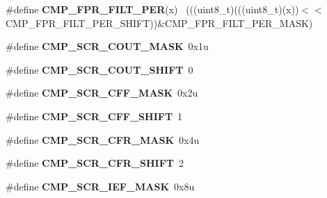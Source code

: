 \begin{DoxyCompactItemize}
\item 
\hypertarget{group___c_m_p___register___masks_ga64552c5393c5361b4e87fae0df10308e}{}\#define {\bfseries C\+M\+P\+\_\+\+F\+P\+R\+\_\+\+F\+I\+L\+T\+\_\+\+P\+E\+R}(x)                                        ~(((uint8\+\_\+t)(((uint8\+\_\+t)(x))$<$$<$C\+M\+P\+\_\+\+F\+P\+R\+\_\+\+F\+I\+L\+T\+\_\+\+P\+E\+R\+\_\+\+S\+H\+I\+F\+T))\&C\+M\+P\+\_\+\+F\+P\+R\+\_\+\+F\+I\+L\+T\+\_\+\+P\+E\+R\+\_\+\+M\+A\+S\+K)\label{group___c_m_p___register___masks_ga64552c5393c5361b4e87fae0df10308e}

\item 
\hypertarget{group___c_m_p___register___masks_ga024aec72a28ecdc04a1441cd7a3af23a}{}\#define {\bfseries C\+M\+P\+\_\+\+S\+C\+R\+\_\+\+C\+O\+U\+T\+\_\+\+M\+A\+S\+K}~0x1u\label{group___c_m_p___register___masks_ga024aec72a28ecdc04a1441cd7a3af23a}

\item 
\hypertarget{group___c_m_p___register___masks_gaa508076192a6b9aed5c4d46282c64394}{}\#define {\bfseries C\+M\+P\+\_\+\+S\+C\+R\+\_\+\+C\+O\+U\+T\+\_\+\+S\+H\+I\+F\+T}~0\label{group___c_m_p___register___masks_gaa508076192a6b9aed5c4d46282c64394}

\item 
\hypertarget{group___c_m_p___register___masks_gaab44e3da0576b12dd809881323944a1c}{}\#define {\bfseries C\+M\+P\+\_\+\+S\+C\+R\+\_\+\+C\+F\+F\+\_\+\+M\+A\+S\+K}~0x2u\label{group___c_m_p___register___masks_gaab44e3da0576b12dd809881323944a1c}

\item 
\hypertarget{group___c_m_p___register___masks_ga076d455f0d5bdad02282cbcce6e04c01}{}\#define {\bfseries C\+M\+P\+\_\+\+S\+C\+R\+\_\+\+C\+F\+F\+\_\+\+S\+H\+I\+F\+T}~1\label{group___c_m_p___register___masks_ga076d455f0d5bdad02282cbcce6e04c01}

\item 
\hypertarget{group___c_m_p___register___masks_ga876bfa2799338c6b10b152940d25c4a7}{}\#define {\bfseries C\+M\+P\+\_\+\+S\+C\+R\+\_\+\+C\+F\+R\+\_\+\+M\+A\+S\+K}~0x4u\label{group___c_m_p___register___masks_ga876bfa2799338c6b10b152940d25c4a7}

\item 
\hypertarget{group___c_m_p___register___masks_ga78595d16db987c96e73ce96fc5436f6b}{}\#define {\bfseries C\+M\+P\+\_\+\+S\+C\+R\+\_\+\+C\+F\+R\+\_\+\+S\+H\+I\+F\+T}~2\label{group___c_m_p___register___masks_ga78595d16db987c96e73ce96fc5436f6b}

\item 
\hypertarget{group___c_m_p___register___masks_gab36859944bb484db243358bb9a1a9692}{}\#define {\bfseries C\+M\+P\+\_\+\+S\+C\+R\+\_\+\+I\+E\+F\+\_\+\+M\+A\+S\+K}~0x8u\label{group___c_m_p___register___masks_gab36859944bb484db243358bb9a1a9692}


\end{DoxyCompactItemize}

